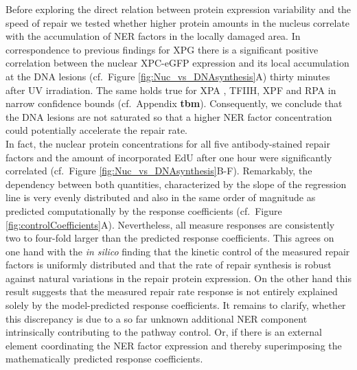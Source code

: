 Before exploring the direct relation between protein expression variability and the speed of repair we tested whether higher protein amounts in the nucleus correlate with the accumulation of NER factors in the locally damaged area. In correspondence to previous findings for XPG \cite{Luijsterburg2010} there is a significant positive correlation between the nuclear XPC-eGFP expression and its local accumulation at the DNA lesions (cf.\ Figure \ref{fig:Nuc_vs_DNAsynthesis}A) thirty minutes after UV irradiation. The same holds true for XPA \cite{Verbruggen2014}, TFIIH, XPF and RPA in narrow confidence bounds (cf.\ Appendix \textbf{tbm}). Consequently, we conclude that the DNA lesions are not saturated so that a higher NER factor concentration could potentially accelerate the repair rate.\\
In fact, the nuclear protein concentrations for all five antibody-stained repair factors and the amount of incorporated EdU after one hour were significantly correlated (cf.\ Figure \ref{fig:Nuc_vs_DNAsynthesis}B-F). Remarkably, the dependency between both quantities, characterized by the slope of the regression line is very evenly distributed and also in the same order of magnitude as predicted computationally by the response coefficients (cf.\ Figure \ref{fig:controlCoefficients}A). Nevertheless, all measure responses are consistently two to four-fold larger than the predicted response coefficients. This agrees on one hand with the \textit{in silico} finding that the kinetic control of the measured repair factors is uniformly distributed and that the rate of repair synthesis is robust against natural variations in the repair protein expression. On the other hand this result suggests that the measured repair rate response is not entirely explained solely by the model-predicted response coefficients. It remains to clarify, whether this discrepancy is due to a so far unknown additional NER component intrinsically contributing to the pathway control. Or, if there is an external element coordinating the NER factor expression and thereby superimposing the mathematically predicted response coefficients.   
       
